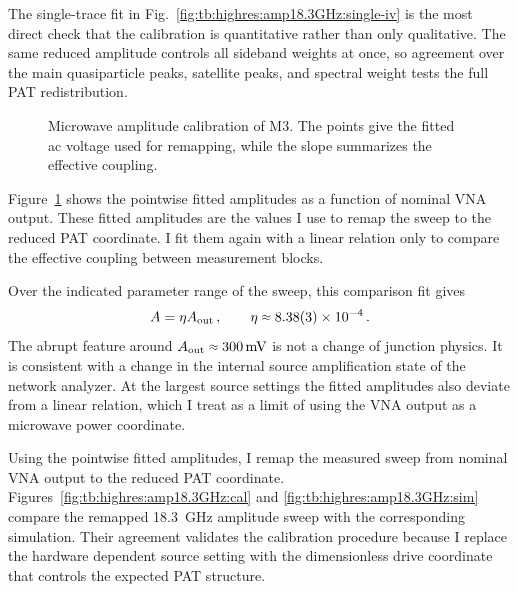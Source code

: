         The single-trace fit in Fig.~\ref{fig:tb:highres:amp18.3GHz:single-iv} is the most direct check that the calibration is quantitative rather than only qualitative. The same reduced amplitude controls all sideband weights at once, so agreement over the main quasiparticle peaks, satellite peaks, and spectral weight tests the full PAT redistribution.

        \begin{figure}
            \captionsetup{format=plain}%
            \centering
            \vspace{-0.5em}
            \vspace{-0.5em}
            \caption{
                Microwave amplitude calibration of M3. The points give the fitted ac voltage used for remapping, while the slope summarizes the effective coupling.
                }
            \label{fig:tb:highres:amp18.3GHz:fit}
        \end{figure}

        Figure~\ref{fig:tb:highres:amp18.3GHz:fit} shows the pointwise fitted amplitudes as a function of nominal VNA output. These fitted amplitudes are the values I use to remap the sweep to the reduced PAT coordinate. I fit them again with a linear relation only to compare the effective coupling between measurement blocks. 
        
        Over the indicated parameter range of the sweep, this comparison fit gives
        \begin{equation}
            A = \eta A_\mathrm{out}\,,\qquad \eta\sapprox8.38(3)\times10^{-4}\,.
            \label{eq:tb:highres:amp18.3GHz:eta}
        \end{equation}
        The abrupt feature around $A_\mathrm{out}\sapprox\qty{300}{\milli\volt}$ is not a change of junction physics. It is consistent with a change in the internal source amplification state of the network analyzer. At the largest source settings the fitted amplitudes also deviate from a linear relation, which I treat as a limit of using the VNA output as a microwave power coordinate.

        Using the pointwise fitted amplitudes, I remap the measured sweep from nominal VNA output to the reduced PAT coordinate. Figures~\ref{fig:tb:highres:amp18.3GHz:cal} and \ref{fig:tb:highres:amp18.3GHz:sim} compare the remapped \qty{18.3}{\giga\hertz} amplitude sweep with the corresponding simulation. Their agreement validates the calibration procedure because I replace the hardware dependent source setting with the dimensionless drive coordinate that controls the expected PAT structure.

